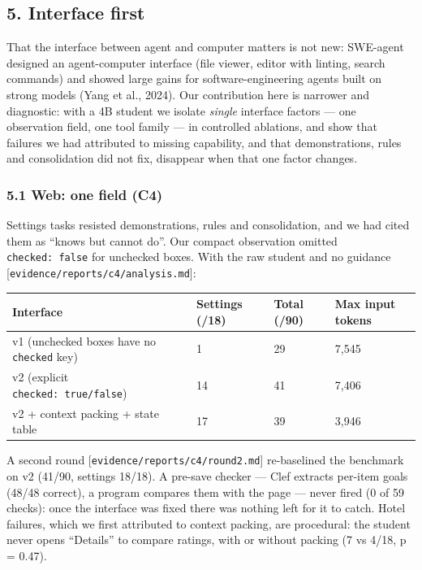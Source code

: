 \documentclass[
  10pt,
]{article}
\newcounter{none} %
\begin{document}
\subsection{5. Interface first}\label{interface-first}

That the interface between agent and computer matters is not new:
SWE-agent designed an agent-computer interface (file viewer, editor with
linting, search commands) and showed large gains for
software-engineering agents built on strong models (Yang et al., 2024).
Our contribution here is narrower and diagnostic: with a 4B student we
isolate \emph{single} interface factors --- one observation field, one
tool family --- in controlled ablations, and show that failures we had
attributed to missing capability, and that demonstrations, rules and
consolidation did not fix, disappear when that one factor changes.

\subsubsection{5.1 Web: one field (C4)}\label{web-one-field-c4}

Settings tasks resisted demonstrations, rules and consolidation, and we
had cited them as ``knows but cannot do''. Our compact observation
omitted \texttt{checked:\ false} for unchecked boxes. With the raw
student and no guidance {[}\texttt{evidence/reports/c4/analysis.md}{]}:

{\def\LTcaptype{none} %
\begin{longtable}[]{@{}llll@{}}
\toprule\noalign{}
Interface & Settings (/18) & Total (/90) & Max input tokens \\
\midrule\noalign{}
\endhead
\bottomrule\noalign{}
\endlastfoot
v1 (unchecked boxes have no \texttt{checked} key) & 1 & 29 & 7,545 \\
v2 (explicit \texttt{checked:\ true/false}) & 14 & 41 & 7,406 \\
v2 + context packing + state table & 17 & 39 & 3,946 \\
\end{longtable}
}

A second round {[}\texttt{evidence/reports/c4/round2.md}{]} re-baselined
the benchmark on v2 (41/90, settings 18/18). A pre-save checker --- Clef
extracts per-item goals (48/48 correct), a program compares them with
the page --- never fired (0 of 59 checks): once the interface was fixed
there was nothing left for it to catch. Hotel failures, which we first
attributed to context packing, are procedural: the student never opens
``Details'' to compare ratings, with or without packing (7 vs 4/18, p =
0.47).
\end{document}
